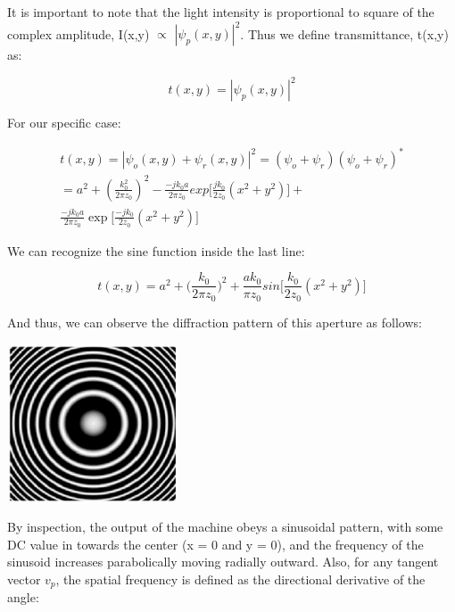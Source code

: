 \documentclass[12pt]{article}
\begin{document}
It is important to note that the light intensity is proportional to square of the complex amplitude, I(x,y) \(\propto\) \(|\psi_{p}(x,y)|^2\).
Thus we define transmittance, t(x,y) as:

\begin{equation}
	t(x,y) = |\psi_{p}(x,y)|^2
\end{equation}

For our specific case:

\begin{equation}
	\begin{multlined}
	t(x,y) = |\psi_{o}(x,y) + \psi_{r}(x,y)|^2
	=(\psi_{o} + \psi_{r})(\psi_{o} + \psi_{r})^*
	\\= a^2 + (\frac{k_{0}^2}{2\pi z_{0}})^2 - \frac{-jk_{0}a}{2\pi z_{0}}
	exp\bigg[ \frac{jk_{0}}{2z_{0}}(x^2 + y^2) \bigg] + 
	\\\frac{-jk_{0}a}{2\pi z_{0}}
	\exp\bigg[\frac{-jk_{0}}{2z_{0}}(x^2 + y^2) \bigg]
	\end{multlined}
\end{equation}

We can recognize the sine function inside the last line:

\begin{equation}
	t(x,y) = a^2 + \big(\frac{k_{0}}{2\pi z_{0}}\big)^2 + 
	\frac{ak_{0}}{\pi z_{0}}sin\bigg[\frac{k_{0}}{2z_{0}}(x^2 + y^2)\bigg]
\end{equation}

And thus, we can observe the diffraction pattern of this aperture as follows:

\begin{center}
\includegraphics[width=50mm]{tupac8.png}
\end{center}

By inspection, the output of the machine obeys a sinusoidal pattern, with some DC value in towards the center (x = 0 and y = 0), and the frequency
of the sinusoid increases parabolically moving radially outward.
Also, for any tangent vector \(v_{p}\), the spatial frequency is defined as the directional derivative of the angle:
\end{document}
